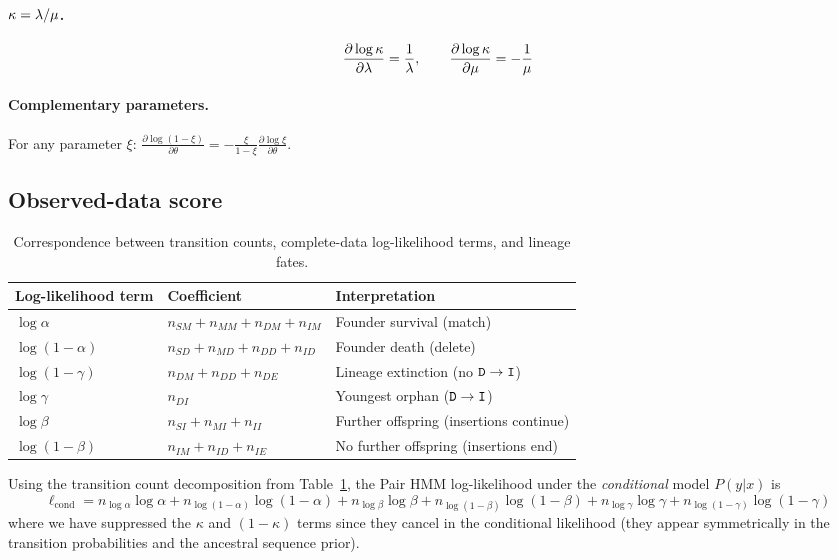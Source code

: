 \paragraph{$\kappa = \lambda/\mu$.}
\[
\frac{\partial \log\kappa}{\partial \lambda} = \frac{1}{\lambda}, \qquad
\frac{\partial \log\kappa}{\partial \mu} = -\frac{1}{\mu}
\]

\paragraph{Complementary parameters.}
For any parameter $\xi$:
$\frac{\partial\log(1-\xi)}{\partial\theta} = -\frac{\xi}{1-\xi}\frac{\partial\log\xi}{\partial\theta}$.

\subsection{Observed-data score}

\begin{table}[ht]
\centering
\caption{Correspondence between transition counts, complete-data log-likelihood terms, and lineage fates.}
\label{tab:hmm-counts}
\begin{tabular}{lll}
\hline
Log-likelihood term & Coefficient & Interpretation \\
\hline
$\log\alpha$ &
  $n_{SM}+n_{MM}+n_{DM}+n_{IM}$ &
  Founder survival (match) \\
$\log(1-\alpha)$ &
  $n_{SD}+n_{MD}+n_{DD}+n_{ID}$ &
  Founder death (delete) \\
$\log(1-\gamma)$ &
  $n_{DM}+n_{DD}+n_{DE}$ &
  Lineage extinction (no ${\tt D} \to {\tt I}$)\\
$\log\gamma$ &
  $n_{DI}$ &
  Youngest orphan (${\tt D} \to {\tt I}$) \\
$\log\beta$ &
  $n_{SI}+n_{MI}+n_{II}$ &
  Further offspring (insertions continue) \\
$\log(1-\beta)$ &
  $n_{IM}+n_{ID}+n_{IE}$ &
  No further offspring (insertions end) \\
\hline
\end{tabular}
\end{table}

Using the transition count decomposition from Table~\ref{tab:hmm-counts},
the Pair HMM log-likelihood under the \emph{conditional} model $P(y|x)$ is
\[
\ell_{\text{cond}} = n_{\log\alpha}\log\alpha + n_{\log(1-\alpha)}\log(1-\alpha)
+ n_{\log\beta}\log\beta + n_{\log(1-\beta)}\log(1-\beta)
+ n_{\log\gamma}\log\gamma + n_{\log(1-\gamma)}\log(1-\gamma)
\]
where we have suppressed the $\kappa$ and $(1-\kappa)$ terms since they cancel in the conditional likelihood
(they appear symmetrically in the transition probabilities and the ancestral sequence prior).

